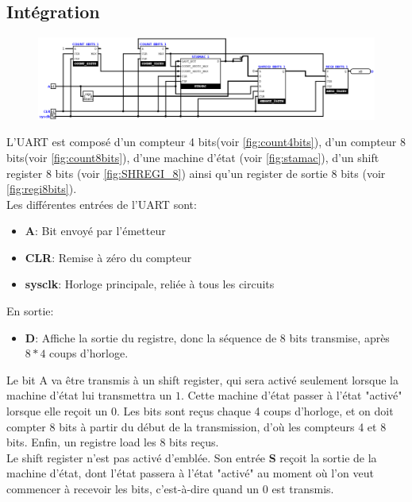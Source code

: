 \documentclass[a4paper]{article} %
\begin{document}
\subsection{Intégration}
\begin{tcolorbox}[colframe=Monokaimagenta,colback=white]
\begin{figure}[H]
\centering
    \includegraphics[width=.8\textwidth]{src/UART.png}
    \label{fig:uart}
\end{figure}

L'UART est composé d'un compteur 4 bits(voir \ref{fig:count4bits}), d'un compteur 8 bits(voir \ref{fig:count8bits}), d'une machine d'état (voir \ref{fig:stamac}), d'un shift register 8 bits (voir \ref{fig:SHREGI_8}) ainsi qu'un register de sortie 8 bits (voir \ref{fig:regi8bits}).\\
Les différentes entrées de l'UART sont:
\begin{itemize}
    \item     \textbf{A}: Bit envoyé par l'émetteur
    \item     \textbf{CLR}: Remise à zéro du compteur
    \item     \textbf{sysclk}: Horloge principale, reliée à tous les circuits
\end{itemize}
En sortie:
\begin{itemize}
    \item     \textbf{D}: Affiche la sortie du registre, donc la séquence de 8 bits transmise, après $8*4$ coups d'horloge.
\end{itemize}
Le bit A va être transmis à un shift register, qui sera activé seulement lorsque la machine d'état lui transmettra un $1$. Cette machine d'état passer à l'état "activé" lorsque elle reçoit un 0. Les bits sont reçus chaque 4 coups d'horloge, et on doit compter 8 bits à partir du début de la transmission, d'où les compteurs 4 et 8 bits. Enfin, un registre load les 8 bits reçus.\\
Le shift register n'est pas activé d'emblée. Son entrée \textbf{S} reçoit la sortie de la machine d'état, dont l'état passera à l'état "activé" au moment où l'on veut commencer à recevoir les bits, c'est-à-dire quand un $0$ est transmis.\\

\end{tcolorbox}
\end{document}
